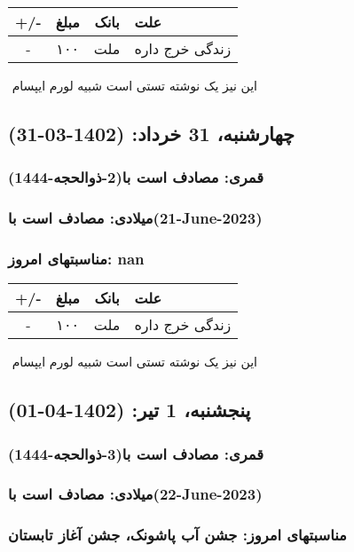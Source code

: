 \documentclass{article}
\newcommand{\rnote}[1]{\marginpar{\textcolor{color}{\StrSubstitute{\##1}{ }{\_}}}}
\newcommand{\myRow}[4]{
    #1 & #2 & #3 & #4 \\ \hline
}
\begin{document}
\begin{tabular}{ | c | c | c | p{5cm} |}
    \hline
    \myRow{ +/- }{مبلغ}{بانک}{علت}
    \myRow{-}{۱۰۰}{ملت}{زندگی خرج داره}
\end{tabular}
\newline
\newline

‌
\rnote{تست}
این نیز یک نوشته تستی است شبیه لورم ایپسام




\newpage
{}
\textcolor{color}{
\section{ چهارشنبه، 31 خرداد: (1402-03-31) }
\subsubsection*{قمری: مصادف است با(2-ذوالحجه-1444)} 
\subsubsection*{میلادی: مصادف است با(21-June-2023)}
\subsubsection*{مناسبتهای امروز: nan}
}


\begin{tabular}{ | c | c | c | p{5cm} |}
    \hline
    \myRow{ +/- }{مبلغ}{بانک}{علت}
    \myRow{-}{۱۰۰}{ملت}{زندگی خرج داره}
\end{tabular}
\newline
\newline

‌
\rnote{تست}
این نیز یک نوشته تستی است شبیه لورم ایپسام




\newpage
{}
\textcolor{color}{
\section{ پنجشنبه، 1 تیر: (1402-04-01) }
\subsubsection*{قمری: مصادف است با(3-ذوالحجه-1444)} 
\subsubsection*{میلادی: مصادف است با(22-June-2023)}
\subsubsection*{مناسبتهای امروز: جشن آب پاشونک، جشن آغاز تابستان}
}
\end{document}
